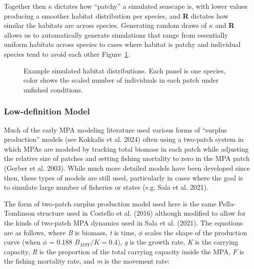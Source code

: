 \documentclass[
  default,
  lineno,
  referee]{sn-jnl}
\begin{document}
Together then \(\kappa\) dictates how ``patchy'' a simulated seascape
is, with lower values producing a smoother habitat distribution per
species, and \textbf{R} dictates how similar the habitats are across
species. Generating random draws of \(\kappa\) and \textbf{R} allows us
to automatically generate simulations that range from essentially
uniform habitats across species to cases where habitat is patchy and
individual species tend to avoid each other Figure~\ref{fig-hab}.

\begin{figure}


\caption{\label{fig-hab}Example simulated habitat distributions. Each
panel is one species, color shows the scaled number of individuals in
each patch under unfished conditions.}

\end{figure}%

\subsubsection{Low-definition Model}\label{low-definition-model}

Much of the early MPA modeling literature used various forms of
``surplus production'' models (see Kokkalis et al. 2024) often using a
two-patch system in which MPAs are modeled by tracking total biomass in
each patch while adjusting the relative size of patches and setting
fishing mortality to zero in the MPA patch (Gerber et al. 2003). While
much more detailed models have been developed since then, these types of
models are still used, particularly in cases where the goal is to
simulate large number of fisheries or states (e.g. Sala et al. 2021).

The form of two-patch surplus production model used here is the same
Pella-Tomlinson structure used in Costello et al. (2016) although
modified to allow for the kinds of two-patch MPA dynamics used in Sala
et al. (2021). The equations are as follows, where \emph{B} is biomass,
\emph{t} is time, \(\phi\) scales the shape of the production curve
(when \(\phi\) = 0.188 \(B_{MSY}/K = 0.4\)), \emph{g} is the growth
rate, \emph{K} is the carrying capacity, \emph{R} is the proportion of
the total carrying capacity inside the MPA, \(F\) is the fishing
mortality rate, and \emph{m} is the movement rate:
\end{document}
